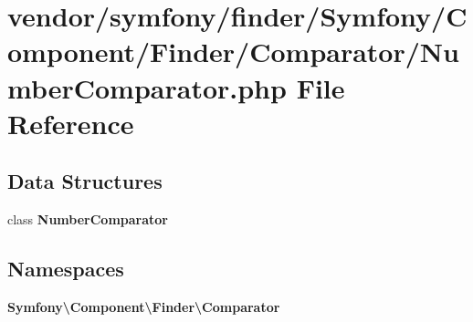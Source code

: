 \section{vendor/symfony/finder/\+Symfony/\+Component/\+Finder/\+Comparator/\+Number\+Comparator.php File Reference}
\label{_number_comparator_8php}
\subsection*{Data Structures}
\begin{DoxyCompactItemize}
\item 
class {\bf Number\+Comparator}
\end{DoxyCompactItemize}
\subsection*{Namespaces}
\begin{DoxyCompactItemize}
\item 
 {\bf Symfony\textbackslash{}\+Component\textbackslash{}\+Finder\textbackslash{}\+Comparator}
\end{DoxyCompactItemize}
